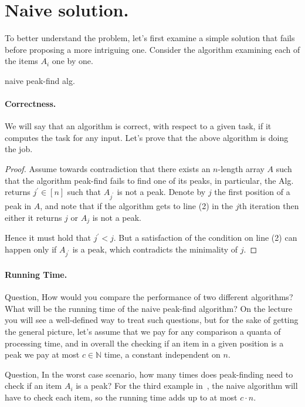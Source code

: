 \section{Naive solution.}
To better understand the problem, let's first examine a simple solution that fails before proposing a more intriguing one. Consider the algorithm examining each of the items $A_{i}$ one by one.
\begin{algorithm}
\caption{naive peak-find alg.}
  { 
    } 
\end{algorithm}
\paragraph{Correctness.}
We will say that an algorithm is correct, with respect to a given task, if it computes the task for any input. Let's prove that the above algorithm is doing the job. 

\begin{proof}
  Assume towards contradiction that there exists an $n$-length array $A$ such that the algorithm peak-find fails to find one of its peaks, in particular, the Alg. returns $j^{\prime}\in [n]$ such that $A_{j^{\prime}}$ is not a peak. Denote by $j$ the first position of a peak in $A$, and note that if the algorithm gets to line (2) in the $j$th iteration then either it returns $j$ or $A_{j}$ is not a peak. 

  Hence it must hold that $j^{\prime} < j$. But a satisfaction of the condition on line (2) can happen only if $A_{j^{\prime}}$ is a peak, which contradicts the minimality of $j$.
\end{proof}

\paragraph{Running Time.} 
Question, How would you compare the performance of two different algorithms? What will be the running time of the naive peak-find algorithm? On the lecture you will see a well-defined way to treat such questions, but for the sake of getting the general picture, let's assume that we pay for any comparison a quanta of processing time, and in overall the checking if an item in a given position is a peak we pay at most $c\in \mathbb{N}$ time, a constant independent on $n$.

Question, In the worst case scenario, how many times does peak-finding need to check if an item $A_i$ is a peak? For the third example in~, the naive algorithm will have to check each item, so the running time adds up to at most $c \cdot n$. 

